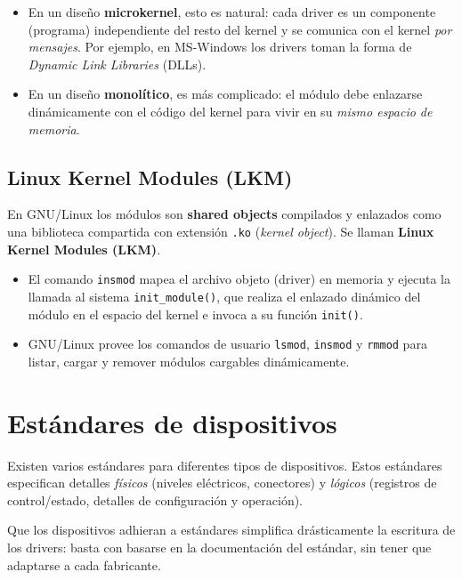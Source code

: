 \documentclass[11pt,a4paper]{article}
\begin{document}
\begin{itemize}[leftmargin=*]
    \item En un diseño \textbf{microkernel}, esto es natural: cada
        driver es un componente (programa) independiente del resto del
        kernel y se comunica con el kernel \emph{por mensajes}. Por
        ejemplo, en MS-Windows los drivers toman la forma de
        \emph{Dynamic Link Libraries} (DLLs).
    \item En un diseño \textbf{monolítico}, es más complicado: el
        módulo debe enlazarse dinámicamente con el código del kernel
        para vivir en su \emph{mismo espacio de memoria}.
\end{itemize}

\subsection{Linux Kernel Modules (LKM)}

En GNU/Linux los módulos son \textbf{shared objects} compilados y
enlazados como una biblioteca compartida con extensión \texttt{.ko}
(\emph{kernel object}). Se llaman \textbf{Linux Kernel Modules (LKM)}.

\begin{itemize}[leftmargin=*]
    \item El comando \texttt{insmod} mapea el archivo objeto (driver)
        en memoria y ejecuta la llamada al sistema
        \verb|init_module()|, que realiza el enlazado dinámico del
        módulo en el espacio del kernel e invoca a su función
        \texttt{init()}.
    \item GNU/Linux provee los comandos de usuario \texttt{lsmod},
        \texttt{insmod} y \texttt{rmmod} para listar, cargar y remover
        módulos cargables dinámicamente.
\end{itemize}

\section{Estándares de dispositivos}

Existen varios estándares para diferentes tipos de dispositivos. Estos
estándares especifican detalles \emph{físicos} (niveles eléctricos,
conectores) y \emph{lógicos} (registros de control/estado, detalles de
configuración y operación).

\begin{idea}
Que los dispositivos adhieran a estándares simplifica drásticamente la
escritura de los drivers: basta con basarse en la documentación del
estándar, sin tener que adaptarse a cada fabricante.
\end{idea}
\end{document}

